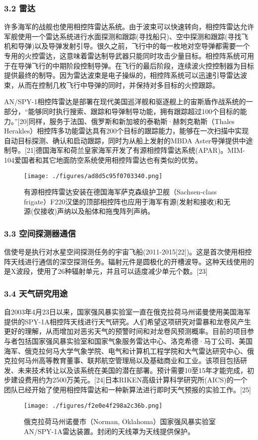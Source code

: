 \subsubsection{3.2 雷达}
许多海军的战舰也使用相控阵雷达系统。由于波束可以快速转向，相控阵雷达允许军舰使用一个雷达系统进行水面探测和跟踪(寻找船只)、空中探测和跟踪(寻找飞机和导弹)以及导弹发射引导。很久之前，飞行中的每一枚地对空导弹都需要一个专用的火控雷达，这意味着雷达制导武器只能同时攻击少量目标。相控阵系统可用于在导弹飞行的中期阶段控制导弹。在飞行的最后阶段，连续波火控控制器为目标提供最终的制导。因为雷达波束是电子操纵的，相控阵系统可以迅速引导雷达波束，从而在控制几枚飞行中导弹的同时，并保持对多目标的火控跟踪。

AN/SPY-1相控阵雷达是部署在现代美国巡洋舰和驱逐舰上的宙斯盾作战系统的一部分，“能够同时执行搜索、跟踪和导弹制导功能，拥有跟踪超过100个目标的能力。”[20]同样，服务于法国、俄罗斯和新加坡的泰勒斯·赫刺克勒斯（Thales Herakles）相控阵多功能雷达具有200个目标的跟踪能力，能够在一次扫描中实现自动目标探测、确认和启动跟踪，同时为从船上发射的MBDA Aster导弹提供中途制导。[21]德国海军和荷兰皇家海军开发了有源相控阵雷达系统(APAR)。MIM-104爱国者和其它地面防空系统使用相控阵雷达也有类似的优势。
\begin{figure}[ht]
\centering
\texttt{[image: ./figures/ad8d5c95f0703340.png]}
\caption{有源相控阵雷达安装在德国海军萨克森级护卫舰（Sachsen-class frigate）F220汉堡的顶部相控阵也应用于海军有源(发射和接收)和无源(仅接收)声纳以及船体和拖曳阵列声纳。} \label{fig_XKZ_8}
\end{figure}

\subsubsection{3.3 空间探测器通信}
信使号是执行对水星空间探测任务的宇宙飞船(2011-2015[22])。这是首次使用相控阵天线进行通信的深空探测任务。辐射元件是圆极化的开槽波导。这种天线使用的是X波段，使用了26种辐射单元，并且可以适度减少单元个数。[23]

\subsubsection{3.4 天气研究用途}
自2003年4月23日以来，国家强风暴实验室一直在俄克拉荷马州诺曼使用美国海军提供的SPY-1A相控阵天线进行天气研究。人们希望这项研究对雷暴和龙卷风产生更好的理解，从而增加对恶劣天气的预警时间和对龙卷风预测概率。目前的项目参与者包括国家强风暴实验室和国家气象服务雷达中心、洛克希德·马丁公司、美国海军、俄克拉何马大学气象学院、电气和计算机工程学院和大气雷达研究中心、俄克拉何马州高等教育董事、联邦航空管理局以及基础商业和工业。该项目包括研发、未来技术转让以及该系统在美国的潜在部署。预计需要10至15年才能完成，初步建设费用约为2500万美元。[24]日本RIKEN高级计算科学研究所(AICS)的一个团队已经开始了使用相控阵雷达和一种新算法进行即时天气预报的实验工作。[25]
\begin{figure}[ht]
\centering
\texttt{[image: ./figures/f2e0e4f298a2c36b.png]}
\caption{俄克拉荷马州诺曼市（Norman, Oklahoma）国家强风暴实验室AN/SPY-1A雷达装置。封闭的天线罩为天线提供保护。} \label{fig_XKZ_9}
\end{figure}

